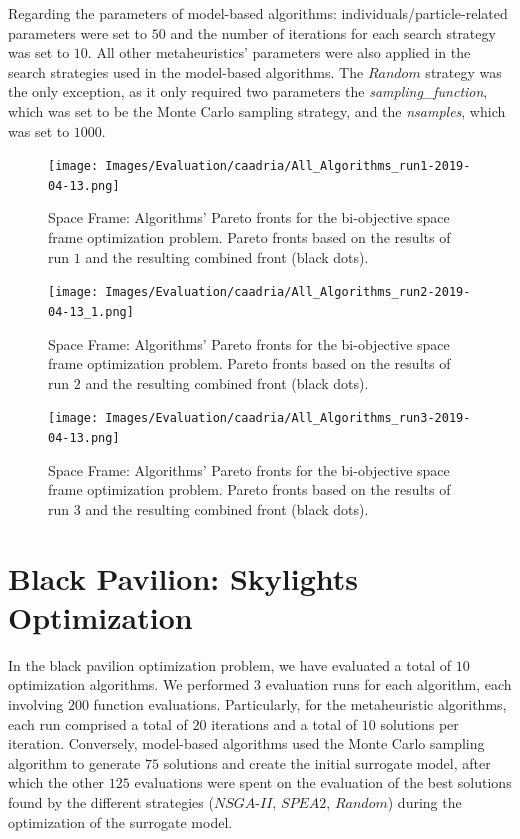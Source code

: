 Regarding the parameters of model-based algorithms: individuals/particle-related parameters were set to $50$ and the number of iterations for each search strategy was set to $10$. All other metaheuristics' parameters were also applied in the search strategies used in the model-based algorithms. The $Random$ strategy was the only exception, as it only required two parameters the \textit{sampling\_function}, which was set to be the Monte Carlo sampling strategy, and the \textit{nsamples}, which was set to $1000$.

\begin{figure}[h!]
	\centering
	\texttt{[image: Images/Evaluation/caadria/All\_Algorithms\_run1-2019-04-13.png]}
	\caption[Space Frame: Pareto Fronts for run 1]{Space Frame: Algorithms' Pareto fronts for the bi-objective space frame optimization problem. Pareto fronts based on the results of run $1$ and the resulting combined front (black dots).}
	\label{table:spaceframerun1}
\end{figure}

\begin{figure}[h!]
	\centering
	\texttt{[image: Images/Evaluation/caadria/All\_Algorithms\_run2-2019-04-13\_1.png]}
	\caption[Space Frame: Pareto Fronts for run 2]{Space Frame: Algorithms' Pareto fronts for the bi-objective space frame optimization problem. Pareto fronts based on the results of run $2$ and the resulting combined front (black dots).}
	\label{table:spaceframesrun2}
\end{figure}

\begin{figure}[h!]
	\centering
	\texttt{[image: Images/Evaluation/caadria/All\_Algorithms\_run3-2019-04-13.png]}
	\caption[Space Frame: Pareto Fronts for run 3]{Space Frame: Algorithms' Pareto fronts for the bi-objective space frame optimization problem. Pareto fronts based on the results of run $3$ and the resulting combined front (black dots).}
	\label{table:spaceframerun3}
\end{figure}


\section{Black Pavilion: Skylights Optimization}
\label{sec:blackpavilionextra}

In the black pavilion optimization problem, we have evaluated a total of $10$ optimization algorithms. We performed $3$ evaluation runs for each algorithm, each involving $200$ function evaluations. Particularly, for the metaheuristic algorithms, each run comprised a total of $20$ iterations and a total of $10$ solutions per iteration. Conversely, model-based algorithms used the Monte Carlo sampling algorithm to generate $75$ solutions and create the initial surrogate model, after which the other $125$ evaluations were spent on the evaluation of the best solutions found by the different strategies ($NSGA$-$II$, $SPEA2$, $Random$) during the optimization of the surrogate model.

